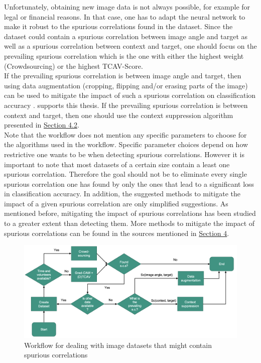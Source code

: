 \documentclass{article}
\begin{document}
Unfortunately, obtaining new image data is not always possible, for example for legal or financial reasons. In that case, one has to adapt the neural network
to make it robust to the spurious correlations found in the dataset. Since the dataset could contain a spurious correlation between image angle and target
as well as a spurious correlation between context and target, one should focus on the prevailing spurious correlation which is the one with either
the highest weight (Crowdsourcing) or the highest TCAV-Score. \\
If the prevailing spurious correlation is between image angle and target, then using data augmentation (cropping, flipping and/or erasing parts of the image)
can be used to mitigate the impact of such a spurious correlation on classification accuracy \cite{Agarwal_2020_CVPR}.
supports this thesis. 
If the prevailing spurious correlation is between context and target, then one should use the context suppression algorithm presented in
\hyperref[sec:contextSuppr]{Section 4.2}. \\
Note that the workflow does not mention any specific parameters to choose for the algorithms used in the workflow. Specific parameter choices depend on how restrictive
one wants to be when detecting spurious correlations. However it is important to note that most datasets of a certain size contain a least one spurious correlation.
Therefore the goal should not be to eliminate every single spurious correlation one has found by only the ones that lead to a significant loss in
classification accuracy. In addition, the suggested methods to mitigate the impact of a given spurious correlation are only simplified suggestions.
As mentioned before, mitigating the impact of spurious correlations has been studied to a greater extent than detecting them. 
More methods to mitigate the impact of spurious correlations can be found in the sources mentioned in \hyperref[sec:mitigatingscs]{Section 4}.

\begin{figure}
    \centering
    \includegraphics[scale=0.42]{sc_workflow.png}
    \caption{Workflow for dealing with image datasets that might contain spurious correlations}
    \label{fig:workflow}
\end{figure}
\end{document}
